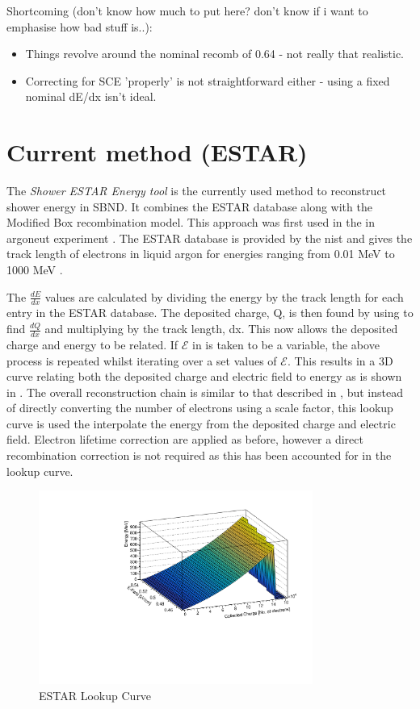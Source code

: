 Shortcoming (don't know how much to put here? don't know if i want to emphasise how bad stuff is..): 
\begin{itemize}
    \item Things revolve around the nominal recomb of 0.64 - not really that realistic. 
    \item Correcting for SCE 'properly' is not straightforward either - using a fixed nominal dE/dx isn't ideal.
\end{itemize}

\section{Current method (ESTAR)}
The \textit{Shower ESTAR Energy tool} is the currently used method to reconstruct shower energy in SBND. It combines the ESTAR database along with the Modified Box recombination model. This approach was first used in the in \Gls{argoneut} experiment \cite{ArgoNeuT_ESTAR_paper}. The ESTAR database is provided by the \Gls{nist} and gives the track length of electrons in liquid argon for energies ranging from 0.01 MeV to 1000 MeV \cite{ESTAR_Database}.

The $\frac{dE}{dx}$ values are calculated by dividing the energy by the track length for each entry in the ESTAR database. The deposited charge, Q, is then found by using  to find $\frac{dQ}{dx}$ and multiplying by the track length, dx. This now allows the deposited charge and energy to be related. If $\mathcal{E}$ in  is taken to be a variable, the above process is repeated whilst iterating over a set values of $\mathcal{E}$. This results in a 3D curve relating both the deposited charge and electric field to energy as is shown in . The overall reconstruction chain is similar to that described in , but instead of directly converting the number of electrons using a scale factor, this lookup curve is used the interpolate the energy from the deposited charge and electric field. Electron lifetime correction are applied as before, however a direct recombination correction is not required as this has been accounted for in the lookup curve. 

\begin{figure}[h]
    \centering
    \includegraphics[width = 0.8\textwidth]{figures-chap4/ESTAR_lookup_curve.pdf}
    \caption{ESTAR Lookup Curve}
    \label{fig:ESTAR lookup curve}
\end{figure}

